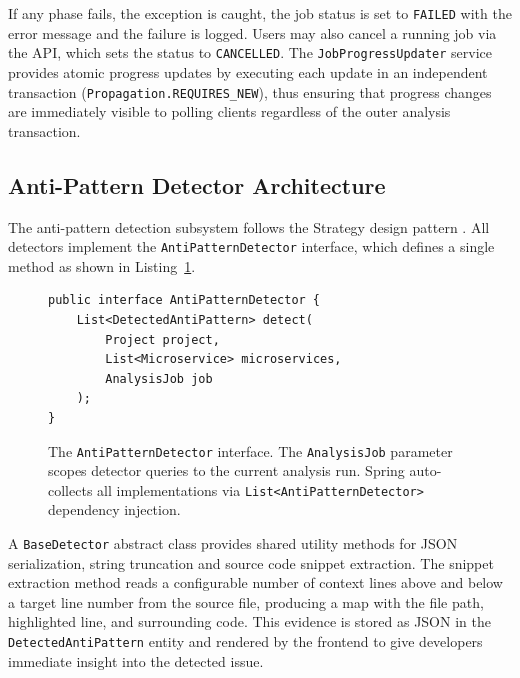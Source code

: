 If any phase fails, the exception is caught, the job status is set to \texttt{FAILED} with the error message and the failure is logged. Users may also cancel a running job via the API, which sets the status to \texttt{CANCELLED}. The \texttt{JobProgressUpdater} service provides atomic progress updates by executing each update in an independent transaction (\texttt{Propagation.REQUIRES\_NEW}), thus ensuring that progress changes are immediately visible to polling clients regardless of the outer analysis transaction.

\subsection{Anti-Pattern Detector Architecture}
\label{subsec:detector-architecture}

 \par The anti-pattern detection subsystem follows the Strategy design pattern \cite{Gamma1994}. All detectors implement the \texttt{AntiPatternDetector} interface, which defines a single method as shown in Listing~\ref{lst:detector-interface}.

\begin{figure}[htbp]
    \begin{verbatim}
public interface AntiPatternDetector {
    List<DetectedAntiPattern> detect(
        Project project,
        List<Microservice> microservices,
        AnalysisJob job
    );
}
    \end{verbatim}
    \caption{The \texttt{AntiPatternDetector} interface. The \texttt{AnalysisJob} parameter scopes detector queries to the current analysis run. Spring auto-collects all implementations via \texttt{List<AntiPatternDetector>} dependency injection.}
    \label{lst:detector-interface}
\end{figure}

A \texttt{BaseDetector} abstract class provides shared utility methods for JSON serialization, string truncation and source code snippet extraction. The snippet extraction method reads a configurable number of context lines above and below a target line number from the source file, producing a map with the file path, highlighted line, and surrounding code. This evidence is stored as JSON in the \texttt{De\-tec\-tedAn\-tiPa\-ttern} entity and rendered by the frontend to give developers immediate insight into the detected issue.

